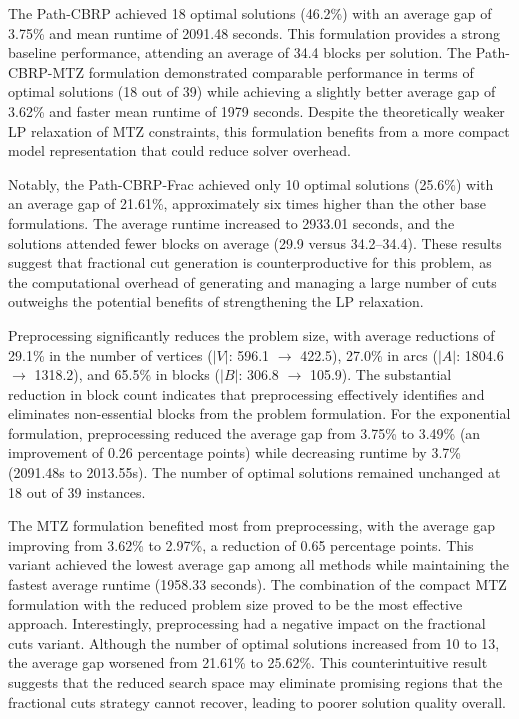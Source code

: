 The Path-CBRP achieved 18 optimal solutions (46.2\%) with an average gap of 3.75\% and mean runtime of 2091.48 seconds. This formulation provides a strong baseline performance, attending an average of 34.4 blocks per solution. The Path-CBRP-MTZ formulation demonstrated comparable performance in terms of optimal solutions (18 out of 39) while achieving a slightly better average gap of 3.62\% and faster mean runtime of 1979 seconds. Despite the theoretically weaker LP relaxation of MTZ constraints, this formulation benefits from a more compact model representation that could reduce solver overhead.

Notably, the Path-CBRP-Frac achieved only 10 optimal solutions (25.6\%) with an average gap of 21.61\%, approximately six times higher than the other base formulations. The average runtime increased to 2933.01 seconds, and the solutions attended fewer blocks on average (29.9 versus 34.2--34.4). These results suggest that fractional cut generation is counterproductive for this problem, as the computational overhead of generating and managing a large number of cuts outweighs the potential benefits of strengthening the LP relaxation.

Preprocessing significantly reduces the problem size, with average reductions of 29.1\% in the number of vertices ($|V|$: 596.1 $\rightarrow$ 422.5), 27.0\% in arcs ($|A|$: 1804.6 $\rightarrow$ 1318.2), and 65.5\% in blocks ($|B|$: 306.8 $\rightarrow$ 105.9). The substantial reduction in block count indicates that preprocessing effectively identifies and eliminates non-essential blocks from the problem formulation. For the exponential formulation, preprocessing reduced the average gap from 3.75\% to 3.49\% (an improvement of 0.26 percentage points) while decreasing runtime by 3.7\% (2091.48s to 2013.55s). The number of optimal solutions remained unchanged at 18 out of 39 instances.

The MTZ formulation benefited most from preprocessing, with the average gap improving from 3.62\% to 2.97\%, a reduction of 0.65 percentage points. This variant achieved the lowest average gap among all methods while maintaining the fastest average runtime (1958.33 seconds). The combination of the compact MTZ formulation with the reduced problem size proved to be the most effective approach. Interestingly, preprocessing had a negative impact on the fractional cuts variant. Although the number of optimal solutions increased from 10 to 13, the average gap worsened from 21.61\% to 25.62\%. This counterintuitive result suggests that the reduced search space may eliminate promising regions that the fractional cuts strategy cannot recover, leading to poorer solution quality overall.


